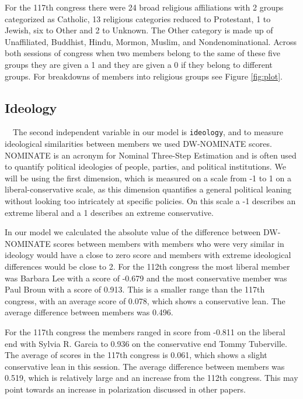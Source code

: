 \documentclass[Royal,times,sageh]{sagej}
\begin{document}
For the 117th congress there were 24 broad religious affiliations with 2
groups categorized as Catholic, 13 religious categories reduced to
Protestant, 1 to Jewish, six to Other and 2 to Unknown. The Other
category is made up of Unaffiliated, Buddhist, Hindu, Mormon, Muslim,
and Nondenominational. Across both sessions of congress when two members
belong to the same of these five groups they are given a 1 and they are
given a 0 if they belong to different groups. For breakdowns of members
into religious groups see Figure \ref{fig:plot}.

\hypertarget{ideology}{%
\subsection{Ideology}\label{ideology}}

\doublespacing

~~The second independent variable in our model is \texttt{ideology}, and
to measure ideological similarities between members we used DW-NOMINATE
scores. NOMINATE is an acronym for Nominal Three-Step Estimation and is
often used to quantify political ideologies of people, parties, and
political institutions. We will be using the first dimension, which is
measured on a scale from -1 to 1 on a liberal-conservative scale, as
this dimension quantifies a general political leaning without looking
too intricately at specific policies. On this scale a -1 describes an
extreme liberal and a 1 describes an extreme conservative.

In our model we calculated the absolute value of the difference between
DW-NOMINATE scores between members with members who were very similar in
ideology would have a close to zero score and members with extreme
ideological differences would be close to 2. For the 112th congress the
most liberal member was Barbara Lee with a score of -0.679 and the most
conservative member was Paul Broun with a score of 0.913. This is a
smaller range than the 117th congress, with an average score of 0.078,
which shows a conservative lean. The average difference between members
was 0.496.

For the 117th congress the members ranged in score from -0.811 on the
liberal end with Sylvia R. Garcia to 0.936 on the conservative end Tommy
Tuberville. The average of scores in the 117th congress is 0.061, which
shows a slight conservative lean in this session. The average difference
between members was 0.519, which is relatively large and an increase
from the 112th congress. This may point towards an increase in
polarization discussed in other papers.
\end{document}
